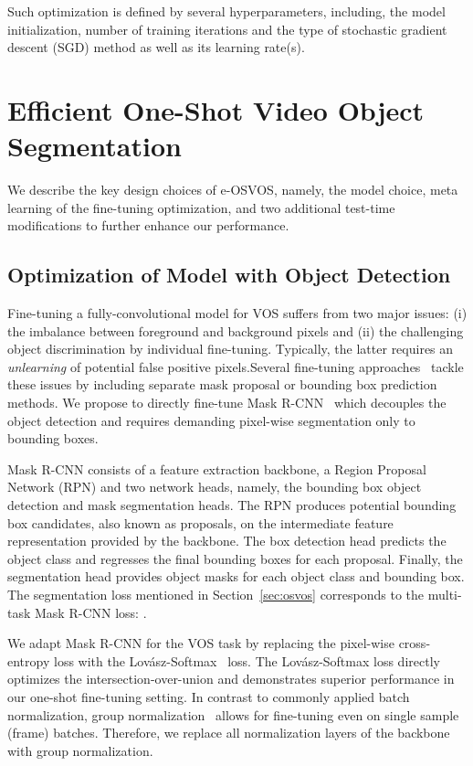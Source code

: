 \documentclass{article}
\begin{document}
Such optimization is defined by several hyperparameters, including, the model initialization, number of training iterations and the type of stochastic gradient descent (SGD) method as well as its learning rate(s).

\section{Efficient One-Shot Video Object Segmentation} \label{sec:eosvos}

    We describe the key design choices of e-OSVOS, namely, the model choice, meta learning of the fine-tuning optimization, and two additional test-time modifications to further enhance our performance.

\subsection{Optimization of Model with Object Detection} \label{sec:mask_rcnn}

    Fine-tuning a fully-convolutional model for VOS suffers from two major issues: (i) the imbalance between foreground and background pixels and (ii) the challenging object discrimination by individual fine-tuning.
Typically, the latter requires an \textit{unlearning} of potential false positive pixels.Several fine-tuning approaches~\cite{OSVOS-S,premvos,onavos} tackle these issues by including separate mask proposal or bounding box prediction methods.
We propose to directly fine-tune Mask R-CNN~\cite{MaskRCNN} which decouples the object detection and requires demanding pixel-wise segmentation only to bounding boxes.


    Mask R-CNN consists of a feature extraction backbone, a Region Proposal Network (RPN) and two network heads, namely, the bounding box object detection and mask segmentation heads.
The RPN produces potential bounding box candidates, also known as proposals, on the intermediate feature representation provided by the backbone.
The box detection head predicts the object class and regresses the final bounding boxes for each proposal. Finally, the segmentation head provides object masks for each object class and bounding box.
The segmentation loss mentioned in Section~\ref{sec:osvos} corresponds to the multi-task Mask R-CNN loss: .


    We adapt Mask R-CNN for the VOS task by replacing the pixel-wise cross-entropy  loss with the Lov{\'a}sz-Softmax~\cite{berman2018lovasz} loss.
The Lov{\'a}sz-Softmax loss directly optimizes the intersection-over-union and demonstrates superior performance in our one-shot fine-tuning setting.
In contrast to commonly applied batch normalization, group normalization~\cite{groupnorm} allows for fine-tuning even on single sample (frame) batches.
Therefore, we replace all normalization layers of the backbone with group normalization.
\end{document}
